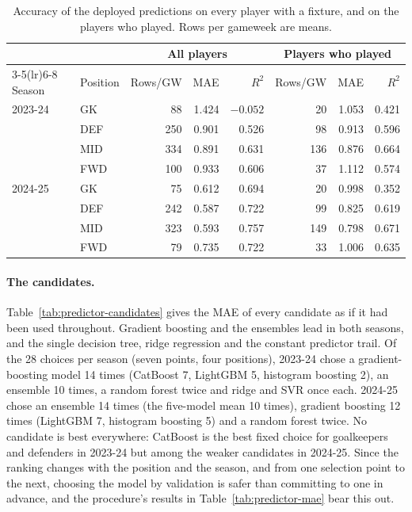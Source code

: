 \documentclass[12pt,oneside,a4paper]{book}
\theoremstyle{definition}
\theoremstyle{remark}
\begin{document}
	\begin{table}[ht]
		\centering
		\caption{Accuracy of the deployed predictions on every player with a fixture, and on the
			players who played. Rows per gameweek are means.}
		\label{tab:predictor-pop}
		\small
		\begin{tabular}{llrrrrrr}
			\toprule
			& & \multicolumn{3}{c}{All players} & \multicolumn{3}{c}{Players who played} \\
			\cmidrule(lr){3-5}\cmidrule(lr){6-8}
			Season & Position & Rows/GW & MAE & $R^2$ & Rows/GW & MAE & $R^2$ \\
			\midrule
			2023-24 & GK  &  88 & 1.424 & $-0.052$ &  20 & 1.053 & 0.421 \\
			& DEF & 250 & 0.901 & 0.526    &  98 & 0.913 & 0.596 \\
			& MID & 334 & 0.891 & 0.631    & 136 & 0.876 & 0.664 \\
			& FWD & 100 & 0.933 & 0.606    &  37 & 1.112 & 0.574 \\
			\midrule
			2024-25 & GK  &  75 & 0.612 & 0.694    &  20 & 0.998 & 0.352 \\
			& DEF & 242 & 0.587 & 0.722    &  99 & 0.825 & 0.619 \\
			& MID & 323 & 0.593 & 0.757    & 149 & 0.798 & 0.671 \\
			& FWD &  79 & 0.735 & 0.722    &  33 & 1.006 & 0.635 \\
			\bottomrule
		\end{tabular}
	\end{table}

	\paragraph{The candidates.} Table~\ref{tab:predictor-candidates} gives the MAE of every
	candidate as if it had been used throughout. Gradient boosting and the ensembles lead in both
	seasons, and the single decision tree, ridge regression and the constant predictor trail. Of
	the 28 choices per season (seven points, four positions), 2023-24 chose a gradient-boosting
	model 14 times (CatBoost 7, LightGBM 5, histogram boosting 2), an ensemble 10 times, a random
	forest twice and ridge and SVR once each. 2024-25 chose an ensemble 14 times (the five-model mean
	10 times), gradient boosting 12 times (LightGBM 7, histogram boosting 5) and a random forest
	twice. No candidate is best everywhere: CatBoost is the best fixed choice for goalkeepers and
	defenders in 2023-24 but among the weaker candidates in 2024-25. Since the ranking changes with
	the position and the season, and from one selection point to the next, choosing the model by
	validation is safer than committing to one in advance, and the procedure's results in
	Table~\ref{tab:predictor-mae} bear this out.
\end{document}
